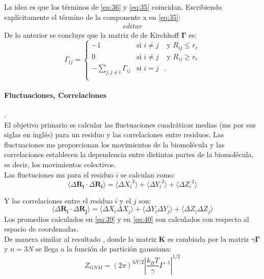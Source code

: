 La idea es que los t\'{e}rminos de \eqref{eq:36} y \eqref{eq:35} coincidan. Escribiendo expl\'{i}citamente el t\'{e}rmino de la componente x en \eqref{eq:35}:
\begin{eqnarray}\label{eq:37}
editar
\end{eqnarray}
De lo anterior se concluye que la matriz de de Kirchhoff $\mathbf{\Gamma}$ es:
\begin{equation}\label{eq:38}
\Gamma_{ij}=\left\{\begin{array}{ccc}
-1 &\mbox{si }i\neq j&\mbox{	y	}R_{ij}\leq r_c \\
0&\mbox{si }i\neq j&\mbox{	y	}R_{ij}\geq r_c \\
-\sum_{j,j\neq i}\Gamma_{ij}&\mbox{si	}i=j&.\\
            \end{array}
\right.
\end{equation}

\paragraph{Fluctuaciones, Correlaciones}.\\
El objetivo primario es calcular las fluctuaciones cuadr\'{a}ticas medias (ms por sus siglas en ingl\'{e}s) para un residuo y las correlaciones entre residuos. Las fluctuaciones ms proporcionan los movimientos de la biomol\'{e}cula y las correlaciones establecen la dependencia entre distintas partes de la biomol\'{e}cula, es decir, los movimientos colectivos.\\

Las fluctuciones ms para el residuo $i$ se calculan como:
\begin{equation}\label{eq:39}
\langle\Delta \mathbf{R_i}\cdot\Delta\mathbf{R_i}\rangle=\langle\Delta{X_i}^2\rangle+\langle\Delta {Y_i}^2\rangle +\langle\Delta {Z_i}^2\rangle 
\end{equation}

Y las correlaciones entre el residuo $i$ y el $j$ son:
\begin{equation}\label{eq:40}
\langle\Delta \mathbf{R_i}\cdot\Delta\mathbf{R_j}\rangle=\langle\Delta X_i\Delta X_j\rangle+\langle\Delta Y_i\Delta Y_j\rangle +\langle\Delta Z_i\Delta Z_j\rangle 
\end{equation}
Los promedios calculados en \eqref{eq:39} y en \eqref{eq:40} son calculados con respecto al espacio de coordenadas.\\

De manera similar al resultado \label{eq:25}, donde la matriz $\mathbf{K}$ es cambiada por la matriz $\gamma\mathbf{\Gamma}$ y $n=3N$ se llega a la funci\'{o}n de partici\'{o}n gaussiana:
\begin{equation}\label{eq:41}
Z_{GNM}=\left(2\pi\right)^{3N/2}\left| \frac{k_BT}{\gamma}\Gamma^{-1}\right|^{1/2}
\end{equation}

